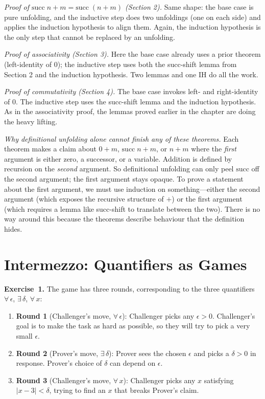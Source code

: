 \documentclass[11pt]{article}
\begin{document}
\emph{Proof of $\text{succ}\; n + m = \text{succ}\;(n + m)$
(Section 2).}  Same shape: the base case is pure unfolding, and the
inductive step does two unfoldings (one on each side) and applies the
induction hypothesis to align them.  Again, the induction hypothesis
is the only step that cannot be replaced by an unfolding.

\emph{Proof of associativity (Section 3).}  Here the base case already
uses a prior theorem (left-identity of $0$); the inductive step uses
both the succ-shift lemma from Section 2 and the induction hypothesis.
Two lemmas and one IH do all the work.

\emph{Proof of commutativity (Section 4).}  The base case invokes
left- and right-identity of $0$.  The inductive step uses the
succ-shift lemma and the induction hypothesis.  As in the associativity
proof, the lemmas proved earlier in the chapter are doing the heavy
lifting.

\emph{Why definitional unfolding alone cannot finish any of these
theorems.}  Each theorem makes a claim about $0 + m$, $\text{succ}\; n
+ m$, or $n + m$ where the \emph{first} argument is either zero, a
successor, or a variable.  Addition is defined by recursion on the
\emph{second} argument.  So definitional unfolding can only peel
$\text{succ}$ off the second argument; the first argument stays
opaque.  To prove a statement about the first argument, we must use
induction on something---either the second argument (which exposes
the recursive structure of $+$) or the first argument (which requires
a lemma like succ-shift to translate between the two).  There is no
way around this because the theorems describe behaviour that the
definition hides.

\section*{Intermezzo: Quantifiers as Games}

\textbf{Exercise~1.}
The game has three rounds, corresponding to the three quantifiers
$\forall\,\epsilon$, $\exists\,\delta$, $\forall\,x$:

\begin{enumerate}
  \item \textbf{Round 1} (Challenger's move, $\forall\,\epsilon$):
        Challenger picks any $\epsilon > 0$.  Challenger's goal is to
        make the task as hard as possible, so they will try to pick a
        very small $\epsilon$.

  \item \textbf{Round 2} (Prover's move, $\exists\,\delta$):
        Prover sees the chosen $\epsilon$ and picks a $\delta > 0$ in
        response.  Prover's choice of $\delta$ can depend on $\epsilon$.

  \item \textbf{Round 3} (Challenger's move, $\forall\,x$):
        Challenger picks any $x$ satisfying $|x - 3| < \delta$, trying
        to find an $x$ that breaks Prover's claim.
\end{enumerate}
\end{document}
